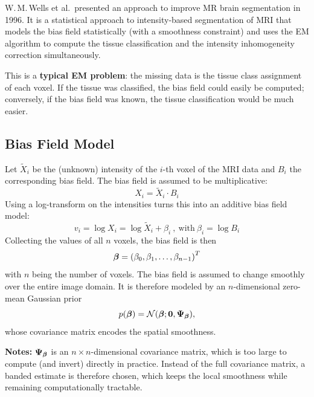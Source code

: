  W.\,M.\,Wells et al.\ presented an approach to improve MR brain segmentation in 1996. It is a statistical approach to intensity-based segmentation of MRI that models the bias field statistically (with a smoothness constraint) and uses the EM algorithm to compute the tissue classification and the intensity inhomogeneity correction simultaneously.

    This is a \textbf{typical EM problem}: the missing data is the tissue class assignment of each voxel. If the tissue was classified, the bias field could easily be computed; conversely, if the bias field was known, the tissue classification would be much easier.

\subsection{Bias Field Model}
  Let $\tilde{X}_i$ be the (unknown) intensity of the $i$-th voxel of the MRI data and $B_i$ the corresponding bias field. The bias field is assumed to be multiplicative:
      \begin{displaymath}
        X_i = \tilde{X}_i \cdot B_i
      \end{displaymath}
  Using a log-transform on the intensities turns this into an additive bias field model:
      \begin{displaymath}
        v_i = \log X_i = \log \tilde{X}_i + \beta_i ~,~\mbox{with}~ \beta_i = \log B_i
      \end{displaymath}
  Collecting the values of all $n$ voxels, the bias field is then
      \begin{displaymath}
        \bm{\mathrm{\beta}} = \left(\beta_0, \beta_1, \ldots, \beta_{n-1}\right)^T
      \end{displaymath}
      with $n$ being the number of voxels.
  The bias field is assumed to change smoothly over the entire image domain. It is therefore modeled by an $n$-dimensional zero-mean Gaussian prior
      \begin{displaymath}
        p(\bm{\mathrm{\beta}}) = {\mathcal N}(\bm{\mathrm{\beta}} ; \bm{\mathrm{0}}, \mathbf{\Psi}_{\bm{\mathrm{\beta}}}),
      \end{displaymath}
  whose covariance matrix encodes the spatial smoothness.

   \textbf{Notes:} $\mathbf{\Psi}_{\bm{\mathrm{\beta}}}$ is an $n \times n$-dimensional covariance matrix, which is too large to compute (and invert) directly in practice. Instead of the full covariance matrix, a banded estimate is therefore chosen, which keeps the local smoothness while remaining computationally tractable.

